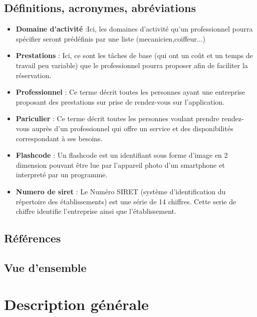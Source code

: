 \documentclass{article}
\begin{document}
\subsection{Définitions, acronymes, abréviations}
\begin{itemize}
\item \textbf{Domaine d'activité} :Ici, les domaines d'activité qu'un professionnel pourra spécifier seront prédéfinis par une liste (mecanicien,coiffeur...)

\item \textbf{Prestations} : Ici, ce sont les tâches de base 
(qui ont un coût et un temps de travail peu variable) que le professionnel pourra proposer afin de faciliter la réservation.
\item \textbf{Professionnel} : Ce terme décrit toutes les personnes ayant une entreprise proposant des
  prestations sur prise de rendez-vous sur l'application.
\item \textbf{Pariculier} : Ce terme décrit toutes les personnes
  voulant prendre rendez-vous auprès d'un professionnel qui offre un service et des disponibilités correspondant à ses besoins.
\item \textbf{Flashcode} : Un flashcode est un identifiant sous forme
  d'image en 2 dimension pouvant être lue par l'appareil photo d'un smartphone et
  interpreté par un programme.
\item \textbf{Numero de siret} : Le Numéro SIRET (système d'identification du répertoire des établissements) est une série de 14 chiffres.
Cette serie de chiffre identifie l'entreprise ainsi que l'établissement.
\end{itemize}


\subsection{Références}

\subsection{Vue d'ensemble}


\section{Description générale}
\end{document}
